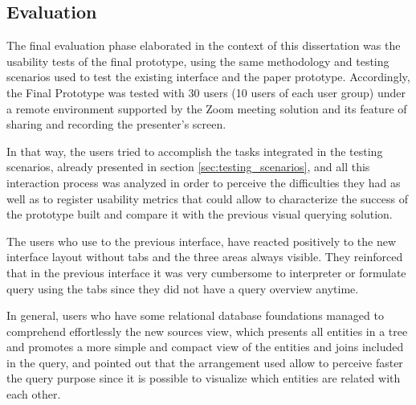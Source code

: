 \subsection{Evaluation}
\label{subsec:service_studio_evaluation}

The final evaluation phase elaborated in the context of this dissertation was the usability tests of the final prototype, using the same methodology and testing scenarios used to test the existing interface and the paper prototype. Accordingly, the Final Prototype was tested with 30 users (10 users of each user group) under a remote environment supported by the Zoom \cite{zoom} meeting solution and its feature of sharing and recording the presenter's screen.

In that way, the users tried to accomplish the tasks integrated in the testing scenarios, already presented in section \ref{sec:testing_scenarios}, and all this interaction process was analyzed in order to perceive the difficulties they had as well as to register usability metrics that could allow to characterize the success of the prototype built and compare it with the previous visual querying solution.


The users who use to the previous interface, have reacted positively to the new interface layout without tabs and the three areas always visible. They reinforced that in the previous interface it was very cumbersome to interpreter or formulate query using the tabs since they did not have a query overview anytime.


In general, users who have some relational database foundations managed to comprehend effortlessly the new sources view, which presents all entities in a tree and promotes a more simple and compact view of the entities and joins included in the query, and pointed out that the arrangement used allow to perceive faster the query purpose since it is possible to visualize which entities are related with each other.

